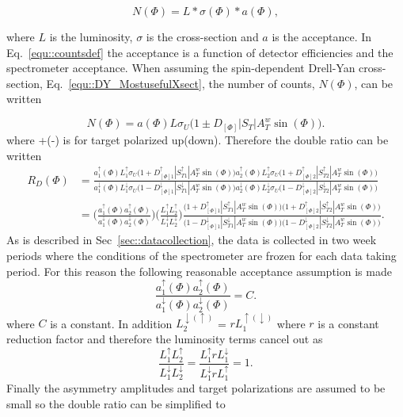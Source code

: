 \begin{equation}
  \label{equ::countsdef}
  N(\Phi) = L * \sigma(\Phi) * a(\Phi),
\end{equation}

\noindent
where $L$ is the luminosity, $\sigma$ is the cross-section and $a$ is the
acceptance.  In Eq.~\ref{equ::countsdef} the acceptance is a function of
detector efficiencies and the spectrometer acceptance.  When assuming the
spin-dependent Drell-Yan cross-section, Eq.~\ref{equ::DY_MostusefulXsect}, the
number of counts, $N(\Phi)$, can be written

\begin{equation}
  \label{equ::spindependentCounts}
  N(\Phi) = a(\Phi)L\sigma_U\Big(1 \pm D_{[\Phi]}|S_T|A^w_T\sin(\Phi)\Big).
\end{equation}
\noindent
where +(-) is for target polarized up(down).  Therefore the double ratio can be
written
\begin{align}
  R_D(\Phi) &= \frac{ a_1^{\uparrow}(\Phi)L_1^{\uparrow}\sigma_U\Big(1 +
    D_{[\Phi]1}^{\uparrow}|S_{T1}^{\uparrow}|A^w_T\sin(\Phi)\Big)
    a_2^{\uparrow}(\Phi)L_2^{\uparrow}\sigma_U\Big(1 +
    D_{[\Phi]2}^{\uparrow}|S_{T2}^{\uparrow}|A^w_T\sin(\Phi)\Big) } {
    a_1^{\downarrow}(\Phi)L_1^{\downarrow}\sigma_U\Big(1 -
    D_{[\Phi]1}^{\downarrow}|S_{T1}^{\downarrow}|A^w_T\sin(\Phi)\Big)
    a_2^{\downarrow}(\Phi)L_2^{\downarrow}\sigma_U\Big(1 -
    D_{[\Phi]2}^{\downarrow}|S_{T2}^{\downarrow}|A^w_T\sin(\Phi)\Big) }
  \\ \nonumber &= \Big(\frac{a_1^{\uparrow}(\Phi)a_2^{\uparrow}(\Phi)}
     {a_1^{\downarrow}(\Phi)a_2^{\downarrow}(\Phi)} \Big)
     \Big(\frac{L_1^{\uparrow}L_2^{\uparrow}}
         {L_1^{\downarrow}L_2^{\downarrow}}\Big)
         \frac{\Big(1+D_{[\Phi]1}^{\uparrow}|S_{T1}^{\uparrow}|A^w_T\sin(\Phi)\Big)
           \Big(1+D_{[\Phi]2}^{\uparrow}|S_{T2}^{\uparrow}|A^w_T\sin(\Phi)\Big)}
              {\Big(1-D_{[\Phi]1}^{\downarrow}|S_{T1}^{\downarrow}|A^w_T\sin(\Phi)\Big)
                \Big(1-D_{[\Phi]2}^{\downarrow}|S_{T2}^{\downarrow}|A^w_T\sin(\Phi)\Big)
              }.
\end{align}
\noindent
As is described in Sec~\ref{sec::datacollection}, the data is collected in two
week periods where the conditions of the spectrometer are frozen for each data
taking period.  For this reason the following reasonable acceptance assumption
is made
\begin{equation}
  \label{equ::a_resonable_assump}
  \frac{a_1^\uparrow(\Phi) a_2^\uparrow(\Phi)}
       {a_1^\downarrow(\Phi) a_2^\downarrow(\Phi)}
       = C.
\end{equation}
\noindent
where $C$ is a constant.  In addition
$L^{\downarrow(\uparrow)}_2$ = $rL^{\uparrow(\downarrow)}_1$ where $r$ is a
constant reduction factor and therefore the luminosity terms cancel out as
\begin{equation}
  \frac{L_1^{\uparrow}L_2^{\uparrow}}{L_1^{\downarrow}L_2^{\downarrow}}
  = \frac{L_1^{\uparrow}rL_1^{\downarrow}}{L_1^{\downarrow}rL_1^{\uparrow}}
  = 1.
\end{equation}
\noindent
Finally the asymmetry amplitudes and target polarizations are assumed to be
small so the double ratio can be simplified to

